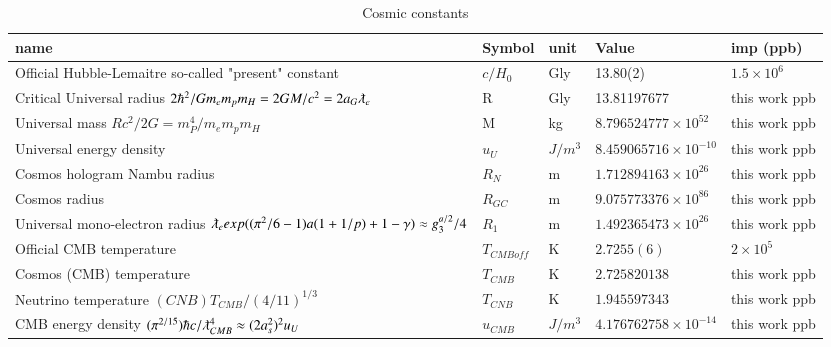 \documentclass[a4paper,9pt]{article}
\begin{document}
\begin{appendix}
\begin{table}
\begin{tabular}{lllll}
    
    \bottomrule
  \end{tabular}
\end{table}

\begin{table}
\caption{Cosmic constants}
\label{tab:3:table3}
  \hskip-2.0cm\begin{tabular}{lllll}
    \toprule
      \cmidrule(r){1-5}
     name & Symbol   & unit   & Value & imp (ppb) \\
 \midrule
   
    
    Official Hubble-Lemaitre so-called "present" constant & $c/H_0$ & Gly & 13.80(2)    & $1.5 \times 10^6$ \\
  
    Critical Universal radius $2\hbar^2/Gm_em_pm_H=2GM/c^2=2a_G\lambdabar_{e}$ & R &  Gly & 13.81197677  & this work ppb\\
   
   Universal mass $Rc^2/2G = m_P^4/m_em_pm_H$ & M & kg & $8.796524777 \times 10^{52}$ & this work ppb \\ 
   
   Universal energy density & $u_U$ & $J/m^3$ & $8.459065716 \times 10^{-10}$ & this work ppb \\
   
   Cosmos hologram Nambu radius & $R_N$ &  m & $1.712894163 \times 10^{26}$ & this work ppb\\
   
   Cosmos radius & $R_{GC}$ &  m & $9.075773376 \times 10^{86}$ & this work ppb \\
   
   Universal mono-electron radius $\lambdabar_e exp((\pi^2/6-1)a(1+1/p)+1-\gamma)\approx g_3^{a/2}/4$ & $R_1$ &  m & $1.492365473 \times 10^{26}$ & this work ppb \\
    
     Official CMB temperature & $T_{CMBoff}$ & K & $2.7255(6)$ & $2 \times 10^5$ \\
    
   Cosmos (CMB) temperature & $T_{CMB}$ & K & $2.725820138$ & this work ppb \\
   
 Neutrino temperature  $(CNB)T_{CMB}/ (4/11)^{1/3}$ & $T_{CNB}$ & K & $1.945597343$ & this work ppb \\
 
 CMB energy density $(\pi^{2/15})\hbar c/ \lambdabar_{CMB}^4 \approx (2a_s^2)^2 u_U$ & $u_{CMB}$ & $J/m^3$ & $4.176762758 \times 10^{-14}$ & this work ppb\\
 

\end{tabular}
\end{table}
\end{appendix}
\end{document}
